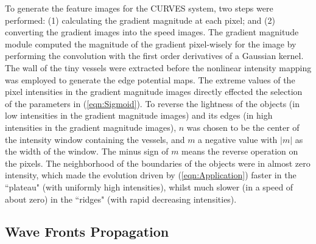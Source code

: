 To generate the feature images for the CURVES system, two steps were performed:
(1) calculating the gradient magnitude at each pixel; and
(2) converting the gradient images into the speed images.
The gradient magnitude module computed the magnitude of the gradient pixel-wisely for the image by performing the convolution with the first order derivatives of a Gaussian kernel.
The wall of the tiny vessels were extracted before the nonlinear intensity mapping was employed to generate the edge potential maps.
The extreme values of the pixel intensities in the gradient magnitude images directly effected the selection of the parameters in (\ref{eqn:Sigmoid}).
To reverse the lightness of the objects (in low intensities in the gradient magnitude images) and its edges (in high intensities in the gradient magnitude images), $n$ was chosen to be the center of the intensity window containing the vessels, and $m$ a negative value with $|m|$ as the width of the window. %
The minus sign of $m$ means the reverse operation on the pixels.
The neighborhood of the boundaries of the objects were in almost zero intensity, which made the evolution driven by (\ref{eqn:Application}) faster in the ``plateau" (with uniformly high intensities), whilst much slower (in a speed of about zero) in the ``ridges" (with rapid decreasing intensities). %

\subsection{Wave Fronts Propagation}

